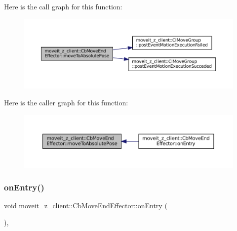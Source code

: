 Here is the call graph for this function\+:
\nopagebreak
\begin{figure}[H]
\begin{center}
\leavevmode
\includegraphics[width=350pt]{classmoveit__z__client_1_1CbMoveEndEffector_a4b77954562c23ba6d0aa0f9c805dfd8d_cgraph}
\end{center}
\end{figure}
Here is the caller graph for this function\+:
\nopagebreak
\begin{figure}[H]
\begin{center}
\leavevmode
\includegraphics[width=350pt]{classmoveit__z__client_1_1CbMoveEndEffector_a4b77954562c23ba6d0aa0f9c805dfd8d_icgraph}
\end{center}
\end{figure}
\mbox{\label{classmoveit__z__client_1_1CbMoveEndEffector_a5306018b432c9d8f8a31823f6b317d84}} 
\subsubsection{\texorpdfstring{on\+Entry()}{onEntry()}}
{\footnotesize\ttfamily void moveit\+\_\+z\+\_\+client\+::\+Cb\+Move\+End\+Effector\+::on\+Entry (\begin{DoxyParamCaption}{ }\end{DoxyParamCaption})\hspace{0.3cm}{\ttfamily [override]}, {\ttfamily [virtual]}}



